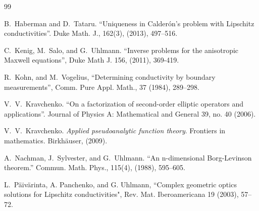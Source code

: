 \documentclass[12pt]{article}
\begin{document}
\begin{thebibliography}{99}

 B.~Haberman and D.~Tataru. ``Uniqueness in Calderón’s problem with Lipschitz conductivities''. Duke Math. J., 162(3), (2013), 497–516.
	




C.~Kenig, M.~Salo, and G.~Uhlmann. ``Inverse problems for the anisotropic Maxwell equations'', Duke Math J. 156, (2011), 369-419.

 R.~Kohn, and M.~Vogelius, ``Determining conductivity by boundary measurements'', Comm. Pure Appl. Math., 37 (1984), 289–298.

 V.~V.~Kravchenko. ``On a factorization of second-order elliptic operators and applications''. Journal of Physics A: Mathematical and General 39, no. 40 (2006).

 V.~V.~Kravchenko.  {\em Applied pseudoanalytic function theory}.  Frontiers in mathematics. Birkh\"{a}user, (2009). %

 A.~Nachman, J.~Sylvester, and G.~Uhlmann. ``An n-dimensional Borg-Levinson theorem.'' Commun. Math. Phys., 115(4), (1988), 595–605.
 
 
 L.~P\"{a}iv\"{a}rinta, A. Panchenko, and G. Uhlmann, ``Complex geometric optics solutions for Lipschitz conductivities", Rev. Mat. Iberoamericana 19 (2003), 57–72.



\end{thebibliography}
\end{document}
